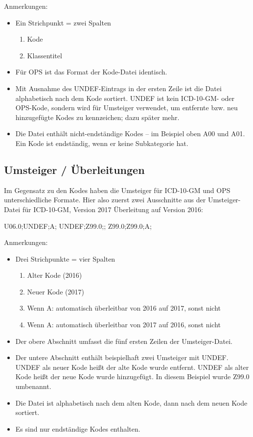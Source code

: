 Anmerkungen: 
\begin{itemize}
\item Ein Strichpunkt = zwei Spalten
\begin{enumerate}
\item Kode
\item Klassentitel
\end{enumerate}
\item Für OPS ist das Format der Kode-Datei identisch.
\item Mit Ausnahme des UNDEF-Eintrags in der ersten Zeile ist die Datei alphabetisch nach dem Kode sortiert. UNDEF ist kein ICD-10-GM- oder OPS-Kode, sondern wird für Umsteiger verwendet, um entfernte bzw. neu hinzugefügte Kodes zu kennzeichen; dazu später mehr.
\item Die Datei enthält nicht-endständige Kodes -- im Beispiel oben A00 und A01. Ein Kode ist endständig, wenn er keine Subkategorie hat. \citep[Kategorie und Kode in der ICD-10-GM]{bfarmicdkk}
\end{itemize}

\subsection{Umsteiger / Überleitungen}

Im Gegensatz zu den Kodes haben die Umsteiger für ICD-10-GM und OPS unterschiedliche Formate. Hier also zuerst zwei Ausschnitte aus der Umsteiger-Datei für ICD-10-GM, Version 2017 Überleitung auf Version 2016:

{U06.0;UNDEF;A;\newline
UNDEF;Z99.0;;\newline
Z99.0;Z99.0;A;
}

Anmerkungen: 
\begin{itemize}
\item Drei Strichpunkte = vier Spalten
\begin{enumerate}
\item Alter Kode (2016)
\item Neuer Kode (2017)
\item Wenn A: automatisch überleitbar von 2016 auf 2017, sonst nicht
\item Wenn A: automatisch überleitbar von 2017 auf 2016, sonst nicht
\end{enumerate}
\item Der obere Abschnitt umfasst die fünf ersten Zeilen der Umsteiger-Datei. 
\item Der untere Abschnitt enthält beispielhaft zwei Umsteiger mit UNDEF. UNDEF als neuer Kode heißt der alte Kode wurde entfernt. UNDEF als alter Kode heißt der neue Kode wurde hinzugefügt. In diesem Beispiel wurde Z99.0 umbenannt. 
\item Die Datei ist alphabetisch nach dem alten Kode, dann nach dem neuen Kode sortiert.
\item Es sind nur endständige Kodes enthalten. 
\end{itemize}

